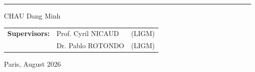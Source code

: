 \begin{titlepage}
\begin{center}
    \vspace{0.5cm}
    \noindent\rule{\textwidth}{0.4pt}

    \vfill
    \Large
    CHAU Dang Minh

    \vfill

    \large
    \begin{tabular}{lll}
      \textbf{Supervisors:}
       & Prof. Cyril NICAUD & (LIGM) \\
       & Dr. Pablo ROTONDO  & (LIGM)
    \end{tabular}


    \vfill

    \large
    Paris, August 2026

  \end{center}
\end{titlepage}